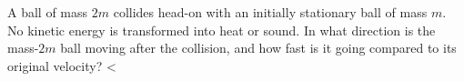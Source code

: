 A ball of mass $2m$ collides head-on with an initially stationary ball of
        mass $m$. No kinetic energy is transformed into heat or sound. In what direction
        is the mass-$2m$ ball moving after the collision, and how fast is it going
        compared to its original velocity?
        <%
